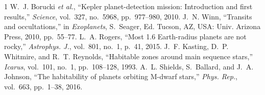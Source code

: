 \documentclass[10pt,twocolumn]{article}
\begin{document}
\begin{thebibliography}{1}\small
{} W.~J. Borucki \textit{et al.}, ``Kepler planet-detection mission: Introduction and first results,'' \textit{Science}, vol.~327, no.~5968, pp.~977--980, 2010.
 J.~N. Winn, ``Transits and occultations,'' in \textit{Exoplanets}, S.~Seager, Ed. Tucson, AZ, USA: Univ. Arizona Press, 2010, pp.~55--77.
 L.~A. Rogers, ``Most 1.6 Earth-radius planets are not rocky,'' \textit{Astrophys. J.}, vol.~801, no.~1, p.~41, 2015.
 J.~F. Kasting, D.~P. Whitmire, and R.~T. Reynolds, ``Habitable zones around main sequence stars,'' \textit{Icarus}, vol.~101, no.~1, pp.~108--128, 1993.
 A.~L. Shields, S.~Ballard, and J.~A. Johnson, ``The habitability of planets orbiting M-dwarf stars,'' \textit{Phys. Rep.}, vol.~663, pp.~1--38, 2016.
\end{thebibliography}
\end{document}
